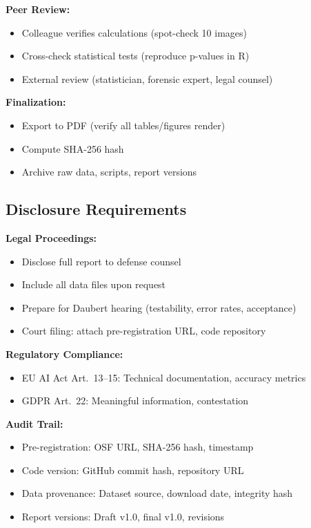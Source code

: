 \textbf{Peer Review:}
\begin{itemize}
\item Colleague verifies calculations (spot-check 10 images)
\item Cross-check statistical tests (reproduce p-values in R)
\item External review (statistician, forensic expert, legal counsel)
\end{itemize}

\textbf{Finalization:}
\begin{itemize}
\item Export to PDF (verify all tables/figures render)
\item Compute SHA-256 hash
\item Archive raw data, scripts, report versions
\end{itemize}

\subsection{Disclosure Requirements}

\textbf{Legal Proceedings:}
\begin{itemize}
\item Disclose full report to defense counsel
\item Include all data files upon request
\item Prepare for Daubert hearing (testability, error rates, acceptance)
\item Court filing: attach pre-registration URL, code repository
\end{itemize}

\textbf{Regulatory Compliance:}
\begin{itemize}
\item EU AI Act Art.~13--15: Technical documentation, accuracy metrics
\item GDPR Art.~22: Meaningful information, contestation
\end{itemize}

\textbf{Audit Trail:}
\begin{itemize}
\item Pre-registration: OSF URL, SHA-256 hash, timestamp
\item Code version: GitHub commit hash, repository URL
\item Data provenance: Dataset source, download date, integrity hash
\item Report versions: Draft v1.0, final v1.0, revisions
\end{itemize}

